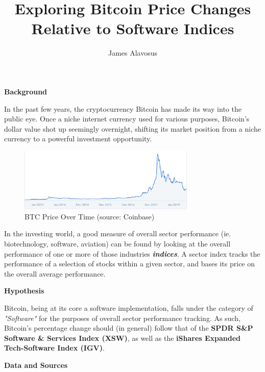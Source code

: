 \documentclass[12pt]{article}
\title{\vspace{-5em}\textbf{Exploring Bitcoin Price Changes Relative to Software Indices}}
\author{James Alavosus}
\date{}
\begin{document}
\maketitle

\begin{center}
\LARGE \textbf{Background}
\end{center}

In the past few years, the cryptocurrency Bitcoin has made its way into the public eye. Once a niche internet currency used for various purposes, Bitcoin's dollar value shot up seemingly overnight, shifting its market position from a niche currency to a powerful investment opportunity. \par

\begin{figure}[h]
\centering
\includegraphics[width=0.75\textwidth]{images/btc-alltime-chart-coinbase.png} 
\caption{BTC Price Over Time (source: Coinbase)}
\end{figure}

In the investing world, a good measure of overall sector performance (ie. biotechnology, software, aviation) can be found by looking at the overall performance of one or more of those industries \textbf{\textit{indices}}. A sector index tracks the performance of a selection of stocks within a given sector, and bases its price on the overall average performance. \par

\begin{center}
\LARGE \textbf{Hypothesis}
\end{center}

Bitcoin, being at its core a software implementation, falls under the category of \textit{"Software"} for the purposes of overall sector performance tracking. As such, Bitcoin's percentage change should (in general) follow that of the \textbf{SPDR S\&P Software \& Services Index (XSW)}, as well as the \textbf{iShares Expanded Tech-Software Index (IGV)}.  

\pagebreak

\begin{center}
\LARGE \textbf{Data and Sources}
\end{center}
\end{document}
